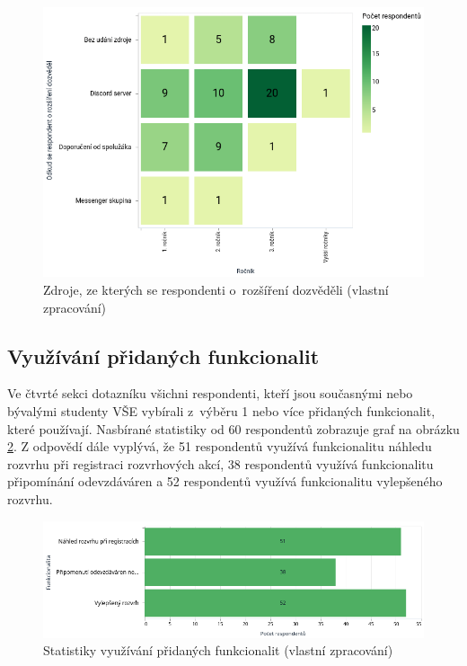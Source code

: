 \begin{figure}[htbp!]\centering
    \includegraphics[width=\textwidth]{img/zdroj-instalace.png}
    \caption{Zdroje, ze kterých se respondenti o~rozšíření dozvěděli (vlastní zpracování)}
    \label{fig:zdroj-instalace}
\end{figure}

\subsection{Využívání přidaných funkcionalit}

Ve čtvrté sekci dotazníku všichni respondenti, kteří jsou současnými nebo bývalými studenty VŠE vybírali z~výběru 1 nebo více přidaných funkcionalit, které používají. Nasbírané statistiky od 60 respondentů zobrazuje graf na obrázku \ref{fig:features-data}. Z odpovědí dále vyplývá, že 51 respondentů využívá funkcionalitu náhledu rozvrhu při registraci rozvrhových akcí, 38 respondentů využívá funkcionalitu připomínání odevzdáváren a 52 respondentů využívá funkcionalitu vylepšeného rozvrhu. 

\begin{figure}[htbp!]\centering
    \includegraphics[width=\textwidth]{img/features.png}
    \caption{Statistiky využívání přidaných funkcionalit (vlastní zpracování)}
    \label{fig:features-data}
\end{figure}

